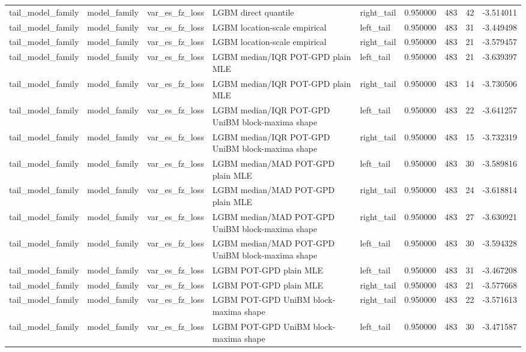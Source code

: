 \begin{tabular}{lllllrrrr}
tail\_model\_family & model\_family & var\_es\_fz\_loss & LGBM direct quantile & right\_tail & 0.950000 & 483 & 42 & -3.514011 \\
tail\_model\_family & model\_family & var\_es\_fz\_loss & LGBM location-scale empirical & left\_tail & 0.950000 & 483 & 31 & -3.449498 \\
tail\_model\_family & model\_family & var\_es\_fz\_loss & LGBM location-scale empirical & right\_tail & 0.950000 & 483 & 21 & -3.579457 \\
tail\_model\_family & model\_family & var\_es\_fz\_loss & LGBM median/IQR POT-GPD plain MLE & left\_tail & 0.950000 & 483 & 21 & -3.639397 \\
tail\_model\_family & model\_family & var\_es\_fz\_loss & LGBM median/IQR POT-GPD plain MLE & right\_tail & 0.950000 & 483 & 14 & -3.730506 \\
tail\_model\_family & model\_family & var\_es\_fz\_loss & LGBM median/IQR POT-GPD UniBM block-maxima shape & left\_tail & 0.950000 & 483 & 22 & -3.641257 \\
tail\_model\_family & model\_family & var\_es\_fz\_loss & LGBM median/IQR POT-GPD UniBM block-maxima shape & right\_tail & 0.950000 & 483 & 15 & -3.732319 \\
tail\_model\_family & model\_family & var\_es\_fz\_loss & LGBM median/MAD POT-GPD plain MLE & left\_tail & 0.950000 & 483 & 30 & -3.589816 \\
tail\_model\_family & model\_family & var\_es\_fz\_loss & LGBM median/MAD POT-GPD plain MLE & right\_tail & 0.950000 & 483 & 24 & -3.618814 \\
tail\_model\_family & model\_family & var\_es\_fz\_loss & LGBM median/MAD POT-GPD UniBM block-maxima shape & right\_tail & 0.950000 & 483 & 27 & -3.630921 \\
tail\_model\_family & model\_family & var\_es\_fz\_loss & LGBM median/MAD POT-GPD UniBM block-maxima shape & left\_tail & 0.950000 & 483 & 30 & -3.594328 \\
tail\_model\_family & model\_family & var\_es\_fz\_loss & LGBM POT-GPD plain MLE & left\_tail & 0.950000 & 483 & 31 & -3.467208 \\
tail\_model\_family & model\_family & var\_es\_fz\_loss & LGBM POT-GPD plain MLE & right\_tail & 0.950000 & 483 & 21 & -3.577668 \\
tail\_model\_family & model\_family & var\_es\_fz\_loss & LGBM POT-GPD UniBM block-maxima shape & right\_tail & 0.950000 & 483 & 22 & -3.571613 \\
tail\_model\_family & model\_family & var\_es\_fz\_loss & LGBM POT-GPD UniBM block-maxima shape & left\_tail & 0.950000 & 483 & 30 & -3.471587 \\

\end{tabular}
